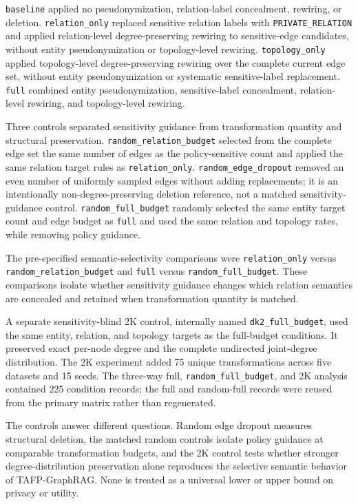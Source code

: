 \documentclass[preprint,12pt]{elsarticle}
\begin{document}
\nolinkurl{baseline} applied no pseudonymization, relation-label concealment, rewiring, or deletion. \nolinkurl{relation_only} replaced sensitive relation labels with \nolinkurl{PRIVATE_RELATION} and applied relation-level degree-preserving rewiring to sensitive-edge candidates, without entity pseudonymization or topology-level rewiring. \nolinkurl{topology_only} applied topology-level degree-preserving rewiring over the complete current edge set, without entity pseudonymization or systematic sensitive-label replacement. \nolinkurl{full} combined entity pseudonymization, sensitive-label concealment, relation-level rewiring, and topology-level rewiring.

Three controls separated sensitivity guidance from transformation quantity and structural preservation. \nolinkurl{random_relation_budget} selected from the complete edge set the same number of edges as the policy-sensitive count and applied the same relation target rules as \nolinkurl{relation_only}. \nolinkurl{random_edge_dropout} removed an even number of uniformly sampled edges without adding replacements; it is an intentionally non-degree-preserving deletion reference, not a matched sensitivity-guidance control. \nolinkurl{random_full_budget} randomly selected the same entity target count and edge budget as \nolinkurl{full} and used the same relation and topology rates, while removing policy guidance.

The pre-specified semantic-selectivity comparisons were \nolinkurl{relation_only} versus \nolinkurl{random_relation_budget} and \nolinkurl{full} versus \nolinkurl{random_full_budget}. These comparisons isolate whether sensitivity guidance changes which relation semantics are concealed and retained when transformation quantity is matched.

A separate sensitivity-blind 2K control, internally named \nolinkurl{dk2_full_budget}, used the same entity, relation, and topology targets as the full-budget conditions. It preserved exact per-node degree and the complete undirected joint-degree distribution. The 2K experiment added 75 unique transformations across five datasets and 15 seeds. The three-way full, \nolinkurl{random_full_budget}, and 2K analysis contained 225 condition records; the full and random-full records were reused from the primary matrix rather than regenerated.

The controls answer different questions. Random edge dropout measures structural deletion, the matched random controls isolate policy guidance at comparable transformation budgets, and the 2K control tests whether stronger degree-distribution preservation alone reproduces the selective semantic behavior of TAFP-GraphRAG. None is treated as a universal lower or upper bound on privacy or utility.
\end{document}
